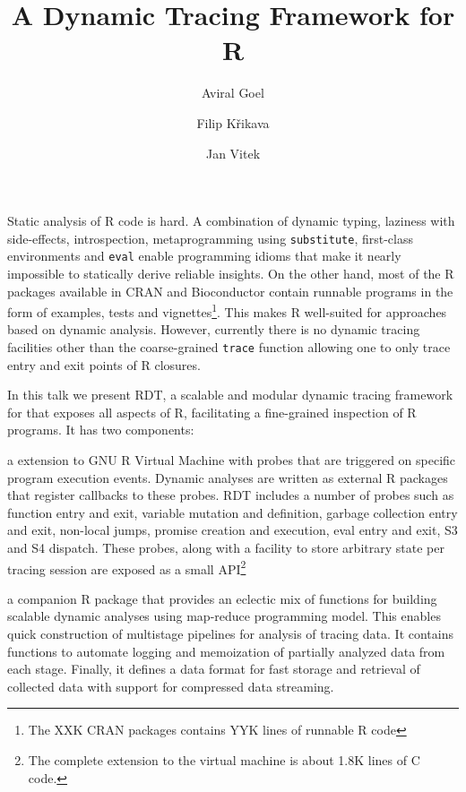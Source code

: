 \documentclass[acmsmall,review]{acmart}
\title{A Dynamic Tracing Framework for R}
\author{Aviral Goel}
\affiliation{
  \institution{Northeastern University}
  \country{USA}
}
\author{Filip Křikava}
\affiliation{
  \institution{Czech Technical University}
  \country{Czechia}
}
\author{Jan Vitek}
\affiliation{
  \institution{Northeastern University}
  \country{USA}
}
\affiliation{
  \institution{Czech Technical University}
  \country{Czechia}
}
\newcommand{\code}[1]{\lstinline|#1|\xspace}
\newcommand{\RDT}{RDT\xspace}
\begin{document}
\maketitle

Static analysis of R code is hard. A combination of dynamic typing, laziness
with side-effects, introspection, metaprogramming using \code{substitute},
first-class environments and \code{eval} enable programming idioms that make it
nearly impossible to statically derive reliable insights. On the other hand,
most of the R packages available in CRAN and Bioconductor contain runnable
programs in the form of examples, tests and vignettes\footnote{The XXK CRAN
  packages contains YYK lines of runnable R code}. This makes R well-suited for
approaches based on dynamic analysis.
%
However, currently there is no dynamic tracing facilities other than the
coarse-grained \code{trace} function allowing one to only trace entry and exit
points of R closures.

In this talk we present \RDT, a scalable and modular dynamic tracing framework
for that exposes all aspects of R, facilitating a fine-grained inspection of R
programs. It has two components:
%
\begin{compactitem}[$-$]
\item a extension to GNU R Virtual Machine with probes that are triggered on
  specific program execution events. Dynamic analyses are written as external R
  packages that register callbacks to these probes. \RDT includes a number of
  probes such as function entry and exit, variable mutation and definition,
  garbage collection entry and exit, non-local jumps, promise creation and
  execution, eval entry and exit, S3 and S4 dispatch. These probes, along with
  a facility to store arbitrary state per tracing session are exposed as a
  small API\footnote{The complete extension to the virtual machine is about 1.8K lines
    of C code.}
\item a companion R package that provides an eclectic mix of functions for
  building scalable dynamic analyses using map-reduce programming model. This
  enables quick construction of multistage pipelines for analysis of tracing
  data. It contains functions to automate logging and memoization of partially
  analyzed data from each stage. Finally, it defines a data format for fast
  storage and retrieval of collected data with support for compressed data
  streaming.
\end{compactitem}
\end{document}
